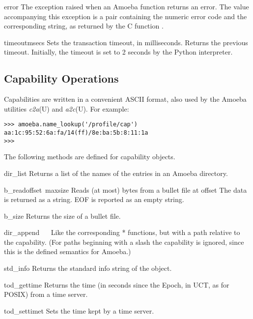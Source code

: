 \begin{excdesc}{error}
The exception raised when an Amoeba function returns an error.
The value accompanying this exception is a pair containing the numeric
error code and the corresponding string, as returned by the C function
.
\end{excdesc}

\begin{funcdesc}{timeout}{msecs}
Sets the transaction timeout, in milliseconds.
Returns the previous timeout.
Initially, the timeout is set to 2 seconds by the Python interpreter.
\end{funcdesc}

\subsection{Capability Operations}

Capabilities are written in a convenient ASCII format, also used by the
Amoeba utilities
{\it c2a}(U)
and
{\it a2c}(U).
For example:

\bcode\begin{verbatim}
>>> amoeba.name_lookup('/profile/cap')
aa:1c:95:52:6a:fa/14(ff)/8e:ba:5b:8:11:1a
>>> 
\end{verbatim}\ecode

The following methods are defined for capability objects.

\renewcommand{\indexsubitem}{(capability method)}
\begin{funcdesc}{dir_list}{}
Returns a list of the names of the entries in an Amoeba directory.
\end{funcdesc}

\begin{funcdesc}{b_read}{offset\, maxsize}
Reads (at most)
bytes from a bullet file at offset
The data is returned as a string.
EOF is reported as an empty string.
\end{funcdesc}

\begin{funcdesc}{b_size}{}
Returns the size of a bullet file.
\end{funcdesc}

\begin{funcdesc}{dir_append}{}
\ 
\ 
Like the corresponding
*
functions, but with a path relative to the capability.
(For paths beginning with a slash the capability is ignored, since this
is the defined semantics for Amoeba.)
\end{funcdesc}

\begin{funcdesc}{std_info}{}
Returns the standard info string of the object.
\end{funcdesc}

\begin{funcdesc}{tod_gettime}{}
Returns the time (in seconds since the Epoch, in UCT, as for POSIX) from
a time server.
\end{funcdesc}

\begin{funcdesc}{tod_settime}{t}
Sets the time kept by a time server.
\end{funcdesc}
